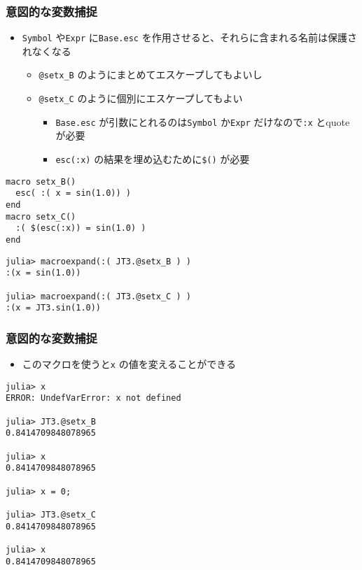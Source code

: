 \begin{frame}[containsverbatim]
\frametitle{意図的な変数捕捉}
\begin{itemize}
  \item \verb|Symbol| や\verb|Expr| に\verb|Base.esc| を作用させると、それらに含まれる名前は保護されなくなる
    \begin{itemize}
      \item \verb|@setx_B| のようにまとめてエスケープしてもよいし
      \item \verb|@setx_C| のように個別にエスケープしてもよい
        \begin{itemize}
          \item \verb|Base.esc| が引数にとれるのは\verb|Symbol| か\verb|Expr| だけなので\verb|:x| とquote が必要
            \item \verb|esc(:x)| の結果を埋め込むために\verb|$()| が必要
        \end{itemize}
    \end{itemize}
\end{itemize}
\begin{lstlisting}
macro setx_B()
  esc( :( x = sin(1.0)) )
end
macro setx_C()
  :( $(esc(:x)) = sin(1.0) )
end

\end{lstlisting}
\begin{lstlisting}
julia> macroexpand(:( JT3.@setx_B ) )
:(x = sin(1.0))

julia> macroexpand(:( JT3.@setx_C ) )
:(x = JT3.sin(1.0))
\end{lstlisting}
\end{frame}

\begin{frame}[containsverbatim]
\frametitle{意図的な変数捕捉}
\begin{itemize}
  \item このマクロを使うと\verb|x| の値を変えることができる
\end{itemize}
\begin{lstlisting}
julia> x
ERROR: UndefVarError: x not defined

julia> JT3.@setx_B
0.8414709848078965

julia> x
0.8414709848078965

julia> x = 0;

julia> JT3.@setx_C
0.8414709848078965

julia> x
0.8414709848078965
\end{lstlisting}

\end{frame}

